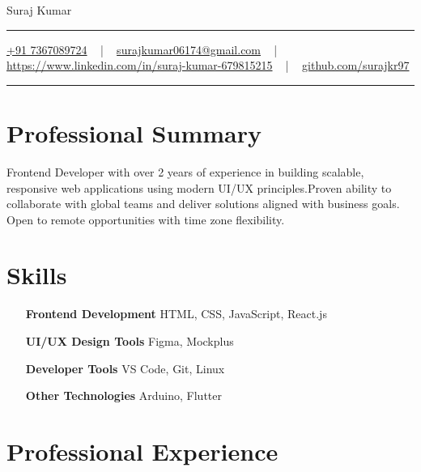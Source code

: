 \documentclass[letterpaper,10pt]{article}
\newcommand{\documentTitle}[2]{
  \begin{center}
    {\Huge\color{accentTitle} #1}
    \vspace{10pt}
    {\color{accentLine} \hrule}
    \vspace{2pt}
    \footnotesize{#2}
    \vspace{2pt}
    {\color{accentLine} \hrule}
  \end{center}
}
\begin{document}
\documentTitle{Suraj Kumar}{
    \href{tel:+917367089724}{
      \raisebox{-0.05\height}{\faPhone} +91 7367089724} ~ | ~
    \href{mailto:surajkumar06174@gmail.com}{
      \raisebox{-0.15\height}{\faEnvelope} surajkumar06174@gmail.com} ~ | ~
    \href{https://linkedin.com/in/suraj-gupta-679815215}{
      \raisebox{-0.15\height}{\faLinkedin} https://www.linkedin.com/in/suraj-kumar-679815215} ~ | ~
    \href{https://github.com/surajkr97}{
      \raisebox{-0.15\height}{\faGithub} github.com/surajkr97}
}

  \section{Professional Summary}
  Frontend Developer with over 2 years of experience in building scalable, responsive web applications using modern UI/UX principles.Proven ability to collaborate with global teams and deliver solutions aligned with business goals. Open to remote opportunities with time zone flexibility.


    \section{Skills}

  \begin{multicols}{2}
    \begin{itemize}[itemsep=-2px, parsep=1pt, leftmargin=120pt]
      \item[\textbf{Frontend Development}] HTML, CSS, JavaScript, React.js
      \item[\textbf{UI/UX Design Tools}] Figma, Mockplus
      \item[\textbf{Developer Tools}] VS Code, Git, Linux
      \item[\textbf{Other Technologies}] Arduino, Flutter
    \end{itemize}
  \end{multicols}


  \section{Professional Experience}
\end{document}
